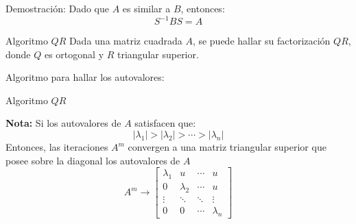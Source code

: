 \documentclass[11pt]{beamer}
\begin{document}
\begin{frame}{Demostraci\'on:}
Dado que $A$ es similar a $B$, entonces:
$$
S^{-1}BS = A
$$
\end{frame}
\begin{frame}{Algoritmo $QR$}
Dada una matriz cuadrada $A$, se puede hallar su factorizaci\'on $QR$, donde $Q$ es ortogonal y $R$ 
triangular superior.

Algoritmo para hallar los autovalores:
\end{frame}
\begin{frame}{Algoritmo $QR$}

{\bf Nota:} Si los autovalores de $A$ satisfacen que:
$$
|\lambda_1|>|\lambda_2|>\cdots>|\lambda_n|
$$
Entonces, las iteraciones $A^m$  convergen  a una matriz triangular superior que posee sobre la 
diagonal los autovalores de $A$
$$
A^m \to \left[\begin{array}{cccc}
                 \lambda_1 & u & \cdots & u\\
                 0 & \lambda_2 & \cdots & u\\
                 \vdots & \ddots & \ddots & \vdots\\
                 0 & 0 & \cdots & \lambda_n
              \end{array}\right]
$$
\end{frame}
\end{document}
